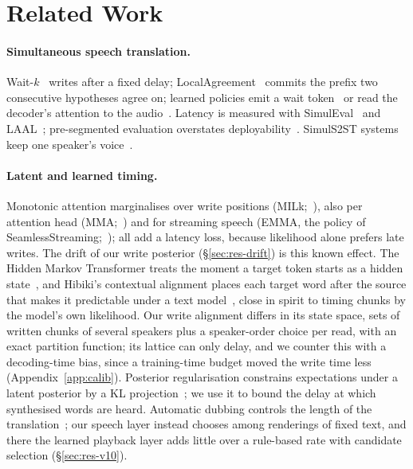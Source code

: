 \section{Related Work}
\label{sec:related}

\paragraph{Simultaneous speech translation.} Wait-$k$~\citep{ma2019stacl} writes after a fixed delay;
LocalAgreement~\citep{liu2020low,polak2022cuni,machacek2023turning} commits the prefix two consecutive hypotheses agree
on; learned policies emit a wait token~\citep{koshkin2024transllama} or read the decoder's attention to the
audio~\citep{papi2023edatt,papi2024streamatt}. Latency is measured with SimulEval~\citep{ma2020simuleval} and LAAL~\citep{papi2022over};
pre-segmented evaluation overstates deployability~\citep{papi2025real}. SimulS2ST systems
keep one speaker's voice~\citep{zhang2024streamspeech,seamless2023,labiausse2025hibiki,cheng2025liveinterpret,he2026simuls2st,deng2025simuls2s}.

\paragraph{Latent and learned timing.} Monotonic attention marginalises over write positions
(MILk;~\citealp{arivazhagan2019milk}), also per attention head (MMA;~\citealp{ma2020mma}) and for streaming speech (EMMA,
the policy of SeamlessStreaming;~\citealp{ma2023emma}); all add a latency loss, because likelihood alone prefers late
writes. The drift of our write posterior (\S\ref{sec:res-drift}) is this known effect. The Hidden Markov Transformer
treats the moment a target token starts as a hidden state~\citep{zhang2023hmt}, and Hibiki's contextual alignment places
each target word after the source that makes it predictable under a text model~\citep{labiausse2025hibiki}, close in
spirit to timing chunks by the model's own likelihood. Our write alignment differs in its state space, sets of written
chunks of several speakers plus a speaker-order choice per read, with an exact partition function; its lattice can only
delay, and we counter this with a decoding-time bias, since a training-time budget moved the write time less
(Appendix~\ref{app:calib}). Posterior
regularisation constrains expectations under a latent posterior by a KL projection~\citep{ganchev2010posterior}; we use
it to bound the delay at which synthesised words are heard. Automatic dubbing controls the length of the
translation~\citep{lakew2022isometric}; our speech layer instead chooses among renderings of fixed text, and there the
learned playback layer adds little over a rule-based rate with candidate selection (\S\ref{sec:res-v10}).

